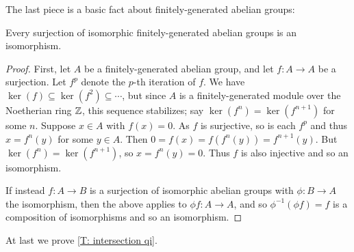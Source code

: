 The last piece is a basic fact about finitely-generated abelian groups:


\begin{lemma}\label{L: surjection of isomorphic groups}
Every surjection of isomorphic finitely-generated abelian groups is an isomorphism.
\end{lemma}
\begin{proof}
First, let $A$ be a finitely-generated abelian group, and let $f \colon A \to A$ be a surjection.
Let $f^p$ denote the $p$-th iteration of $f$.
We have $\ker(f)\subseteq \ker (f^2) \subseteq \cdots$, but since $A$ is a finitely-generated module over the Noetherian ring $\mathbb{Z}$, this sequence stabilizes; say $\ker(f^n)=\ker(f^{n+1})$ for some $n$.
Suppose $x \in A$ with $f(x) = 0$. As $f$ is surjective, so is each $f^p$ and thus $x = f^n(y)$ for some $y \in A$.
Then $0 = f(x) = f(f^n(y)) = f^{n+1}(y)$.
But $\ker(f^n) = \ker(f^{n+1})$, so $x= f^n(y) = 0$.
Thus $f$ is also injective and so an isomorphism.

If instead $f: A \to B$ is a surjection of isomorphic abelian groups with $\phi: B \to A$ the isomorphism, then the above applies to $\phi f \colon A \to A$, and so $\phi^{-1}(\phi f) = f$ is a composition of isomorphisms and so an isomorphism.
\end{proof}

At last we prove \cref{T: intersection qi}.


